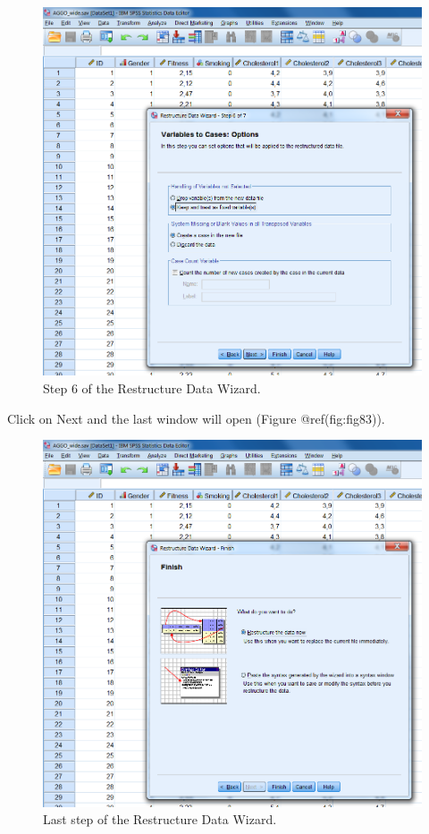 \documentclass[
]{book}
\begin{document}
\begin{figure}

{\centering \includegraphics[width=0.9\linewidth]{images/fig7.12} 

}

\caption{Step 6 of the Restructure Data Wizard.}\label{fig:fig82}
\end{figure}

Click on Next and the last window will open (Figure @ref(fig:fig83)).

\begin{figure}

{\centering \includegraphics[width=0.9\linewidth]{images/fig7.13} 

}

\caption{Last step of the Restructure Data Wizard.}\label{fig:fig83}
\end{figure}
\end{document}
